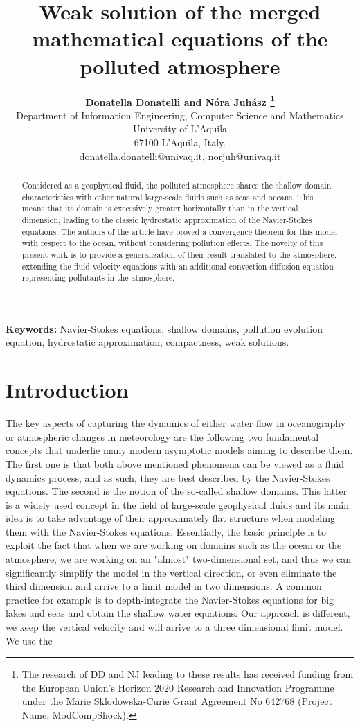 \documentclass[11pt]{article}
\title{Weak solution of the merged mathematical equations of the polluted atmosphere}
\author{
  \large{\bf{Donatella Donatelli} and \bf{N\'ora Juh\'asz}
  \thanks{The research of DD and NJ leading to these results has received funding from the European Union's Horizon 2020 Research and Innovation Programme under the Marie Sklodowska-Curie Grant Agreement No 642768 (Project Name: ModCompShock).}} \\[1ex]
  \normalsize Department of Information Engineering, Computer Science and Mathematics \\
  \normalsize University of L'Aquila \\
  \normalsize 67100 L'Aquila, Italy. \\
  \normalsize {donatella.donatelli@univaq.it},  {norjuh@univaq.it}
}
\date{}
\begin{document}
\maketitle

\begin{abstract}

Considered as a geophysical fluid, the polluted atmosphere shares the shallow domain characteristics with other natural large-scale fluids such as seas and oceans. This means that its domain is excessively greater horizontally than in the vertical dimension, leading to the classic hydrostatic approximation of the Navier-Stokes equations. The authors of the \cite{azerad2001mathematical} article have proved a convergence theorem for this model with respect to the ocean, without considering pollution effects. The novelty of this present work is to provide a generalization of their result translated to the atmosphere, extending the fluid velocity equations with an additional convection-diffusion equation representing pollutants in the atmosphere.

\end{abstract}

{\bf Keywords:} Navier-Stokes equations, shallow domains, pollution evolution equation, hydrostatic approximation, compactness, weak solutions.

\newpage

\tableofcontents
\newpage

\section{Introduction} \label{Introduction}

The key aspects of capturing the dynamics of either water flow in oceanography or atmospheric changes in meteorology are the following two fundamental concepts that underlie many modern asymptotic models aiming to describe them. The first one is that both above mentioned phenomena can be viewed as a fluid dynamics process, and as such, they are best described by the Navier-Stokes equations. The second is the notion of the so-called shallow domains. This latter is a widely used concept in the field of large-scale geophysical fluids and its main idea is to take advantage of their approximately flat structure when modeling them with the Navier-Stokes equations. Essentially, the basic principle is to exploit the fact that when we are working on domains such as the ocean or the atmosphere, we are working on an "almost" two-dimensional set, and thus we can significantly simplify the model in the vertical direction, or even eliminate the third dimension and arrive to a limit model in two dimensions.
A common practice for example is to depth-integrate the Navier-Stokes equations for big lakes and seas and obtain the shallow water equations.
Our approach is different, we keep the vertical velocity and will arrive to a three dimensional limit model.
We use the
\end{document}

